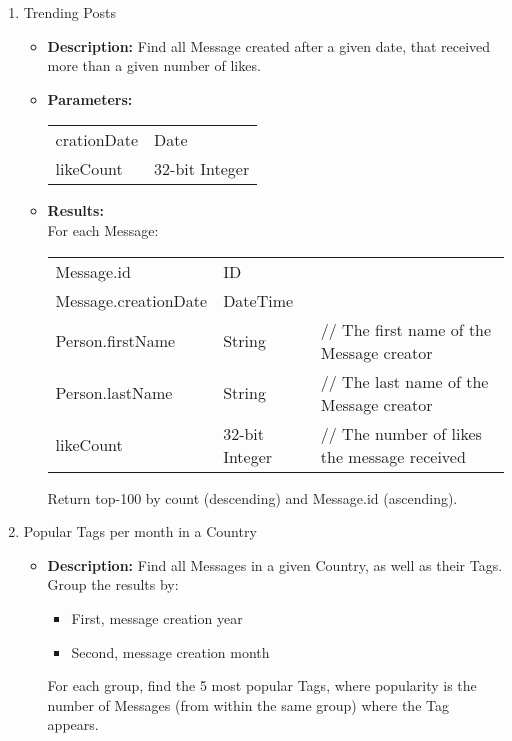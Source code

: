 {\begin{enumerate}
                  \item Trending Posts
                    \begin{itemize}
                      \item \textbf{Description:}
                        Find all Message created after a given date, that received more than a given number of likes.
                      \item \textbf{Parameters:} \\
                        \begin{tabular}{ll}
                          crationDate & Date \\
                          likeCount & 32-bit Integer \\
                        \end{tabular}
                      \item \textbf{Results:} \\
                        For each Message:
                        \begin{tabular}{lll}
                          Message.id & ID & \\
                          Message.creationDate & DateTime & \\
                          Person.firstName & String & \parbox[t]{20cm}{ // The first name of the Message creator \strut} \\
                          Person.lastName & String & \parbox[t]{20cm}{ // The last name of the Message creator \strut} \\
                          likeCount & 32-bit Integer & \parbox[t]{20cm}{ // The number of likes the message received \strut}\\
                        \end{tabular}
                        Return top-100 by count (descending) and Message.id (ascending).
                    \end{itemize}

                  \item Popular Tags per month in a Country
                    \begin{itemize}
                      \item \textbf{Description:}
                        Find all Messages in a given Country, as well as their Tags.
                        Group the results by:
                        \begin{itemize}
                          \item First, message creation year
                          \item Second, message creation month
                        \end{itemize}
                        For each group, find the 5 most popular Tags, where popularity is the number of Messages
                        (from within the same group) where the Tag appears.


\end{itemize}
\end{enumerate}}
